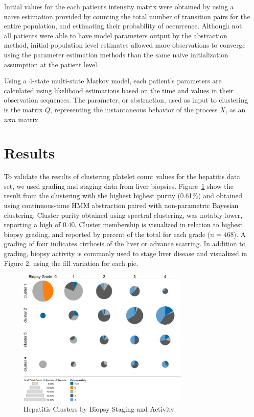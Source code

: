 \documentclass[letterpaper]{article}
\begin{document}
Initial values for the each patients intensity matrix were obtained by using a naive estimation provided by counting the total number of transition pairs for the entire population, and estimating their probability of occurrence. Although not all patients were able to have model parameters output by the abstraction method, initial population level estimates allowed more observations to converge using the parameter estimation methods than the same naive initialization assumption at the patient level.

Using a 4-state multi-state Markov model, each patient's parameters are calculated using likelihood estimations based on the time and values in their observation sequences.  The parameter, or abstraction, used as input to clustering is the matrix $Q$, representing the instantaneous behavior of the process $X$, as an $n$x$n$ matrix.
\noindent
\section{Results}
\noindent
To validate the results of clustering platelet count values for the hepatitis data set, we used grading and staging data from liver biopsies. Figure~\ref{biopsy} show the result from the clustering with the highest highest purity (0.61\%) and obtained using continuous-time HMM abstraction paired with non-parametric Bayesian clustering.  Cluster purity obtained using spectral clustering, was notably lower, reporting a high of $0.40$.  Cluster membership is visualized in relation to highest biopsy grading, and reported by percent of the total for each grade ($n=468$).  A grading of four indicates cirrhosis of the liver or advance scarring. In addition to grading, biopsy activity is commonly used to stage liver disease and visualized in Figure 2. using the fill variation for each pie.

\begin{figure}[h]
\centering
\includegraphics[width=85mm]{fig/hep_2.jpg}
\caption{Hepatitis Clusters by Biopsy Staging and Activity}
\label{biopsy}
\end{figure}
\end{document}
